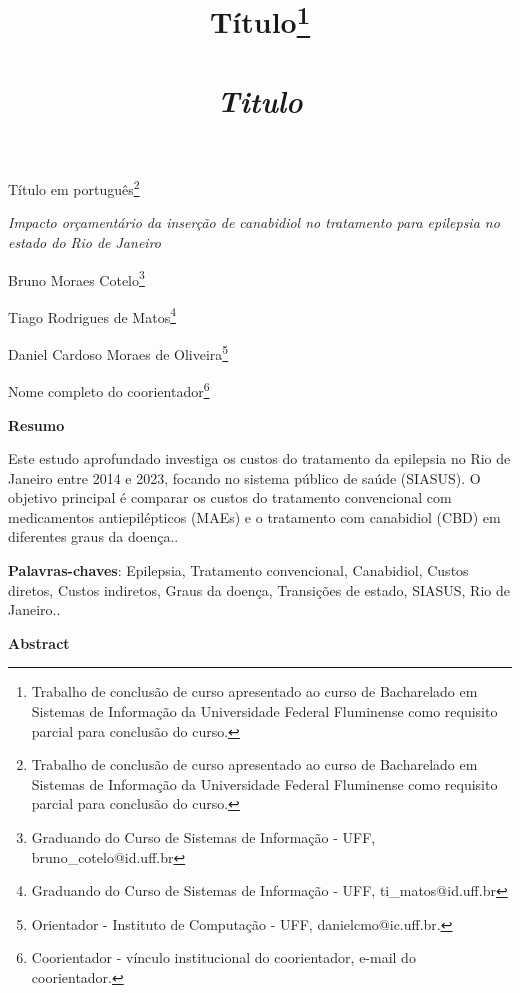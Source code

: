 \documentclass[article,a4paper,12pt,brazil,sumario=tradicional]{abntex2}
\title{ {\Large Título\footnote{Trabalho de conclusão de curso apresentado ao curso de Bacharelado em Sistemas de Informação da Universidade Federal Fluminense como requisito parcial para conclusão do curso.}\\\\
\vspace{.2} 
\textit{Titulo}\\}}
\date{ }
\begin{document}
\textual

\begin{center}
{\Large Título em português\footnote{Trabalho de conclusão de curso apresentado ao curso de Bacharelado em Sistemas de Informação da Universidade Federal Fluminense como requisito parcial para conclusão do curso.}

\textit{Impacto orçamentário da inserção de canabidiol no tratamento para epilepsia no estado do Rio de Janeiro}\\}
\end{center}
\vspace{.2cm} 

\begin{flushright}
Bruno Moraes Cotelo\footnote{Graduando do Curso de Sistemas de Informação - UFF, bruno\_cotelo@id.uff.br}

Tiago Rodrigues de Matos\footnote{Graduando do Curso de Sistemas de Informação - UFF, ti\_matos@id.uff.br}

Daniel Cardoso Moraes de Oliveira\footnote{Orientador - Instituto de Computação - UFF, danielcmo@ic.uff.br.} 

Nome completo do coorientador\footnote{Coorientador - vínculo institucional do coorientador, e-mail do coorientador.}
\end{flushright}

\vspace{\onelineskip}

\begin{center}
    \textbf{Resumo}
\end{center}

\vspace{-.3cm}

\noindent Este estudo aprofundado investiga os custos do tratamento da epilepsia no Rio de Janeiro entre 2014 e 2023, focando no sistema público de saúde (SIASUS). O objetivo principal é comparar os custos do tratamento convencional com medicamentos antiepilépticos (MAEs) e o tratamento com canabidiol (CBD) em diferentes graus da doença..

\vspace{.4cm}
 
\noindent
\textbf{Palavras-chaves}: Epilepsia, Tratamento convencional, Canabidiol, Custos diretos, Custos indiretos, Graus da doença, Transições de estado, SIASUS, Rio de Janeiro.. 
 
\vspace{\onelineskip}

\begin{center}
    \textbf{Abstract}
\end{center}
\end{document}
